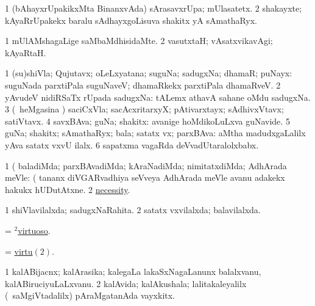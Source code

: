 \bentry 
{} 
\gl{\nA}
\expl{}
\bmng
\bnum
\num{1} (bAhayxrUpakikxMta BinanxvAda) sArasavxrUpa; mUlasatetx. 
\num{2} shakayxte; kAyaRrUpakekx baralu sAdhayxgoLisuva shakitx yA sAmathaRyx. 
\enum
\emng
\eentry

\bentry 
{} 
\gl{\kirxvi}
\expl{}
\bmng
\bnum
\num{1} mUlAMshagaLige saMbaMdhisidaMte. 
\num{2} vasutxtaH; vAsatxvikavAgi; kAyaRtaH. 
\enum
\emng
\eentry

\bentry
{} 
\gl{\nA}
\expl{}
\bmng
\bnum
\num{1} (su)shiVla; Qujutavx; oLeLxyatana; suguNa; sadugxNa; dhamaR; puNayx:  suguNada parxtiPala suguNaveV; dhamaRkekx parxtiPala dhamaRveV. 
\num{2} yAvudeV nidiRSaTx rUpada sadugxNa:  tALemx athavA sahane oMdu sadugxNa. 
\num{3} (\kanmu\ heMgasina \vi) saciCxVla; sacAcxritarxyX; pAtivarxtayx; sAdhivxVtavx; satiVtavx. 
\num{4} savxBAva; guNa; shakitx:  avanige hoMdikoLuLxva guNavide. 
\num{5} guNa; shakitx; sAmathaRyx; bala; satatx vx; parxBAva:  aMtha madudxgaLalilx yAva satatx vxvU ilalx. 
\num{6} sapatxma vagaRda deVvadUtaralolxbabx. 
\enum
\emng

\noindent 
\gl{\pagu}
\expl{}
\bmng
\bnum
\num{1}  (  baladiMda; parxBAvadiMda; kAraNadiMda; nimitatxdiMda; AdhArada meVle:  (  tananx diVGARvadhiya seVveya AdhArada meVle avanu adakekx hakukx hUDutAtxne. 
\num{2}  \hyperref{kandict_n.pdf}{N}{necessity pagu(3)}{necessity}. 
\enum
\emng
\eentry

\bentry 
{} 
\gl{\gu}
\expl{}
\bmng
\bnum
\num{1} shiVlavilalxda; sadugxNaRahita. 
\num{2} satatx vxvilalxda; balavilalxda. 
\enum
\emng
\eentry

\bentry 
{} 
\gl{\gu}
\expl{}
\bmng
 = \hyperlink{virtuoso(2)}{$^2$virtuoso}. 
\emng
\eentry

\bentry 
{} 
\gl{\nA}
\expl{}
\bmng
 = \hyperlink{virtu(2)}{virtu\((2)\)}. 
\emng
\eentry
 
\bentry
{} 
\gl{\nA}
\bmng
\bnum
\num{1} kalABijacnx; kalArasika; kalegaLa lakaSxNagaLanunx balalxvanu, kalABiruciyuLaLxvanu. 
\num{2} kalAvida; kalAkushala; lalitakaleyalilx (\kanmu\ saMgiVtadalilx) pAraMgatanAda vayxkitx. 
\enum
\emng
\eentry

